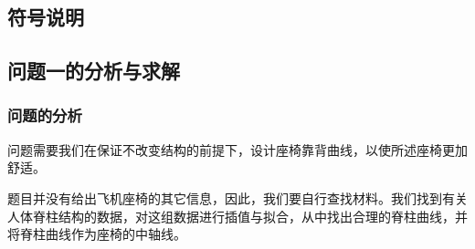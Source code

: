     \subsection{符号说明}
    \subsection{问题一的分析与求解}
        \subsubsection{问题的分析}
            \par
            问题需要我们在保证不改变结构的前提下，设计座椅靠背曲线，以使所述座椅更加舒适。
            \par
            题目并没有给出飞机座椅的其它信息，因此，我们要自行查找材料。我们找到有关人体脊柱结构的数据，对这组数据进行插值与拟合，从中找出合理的脊柱曲线，并将脊柱曲线作为座椅的中轴线。
